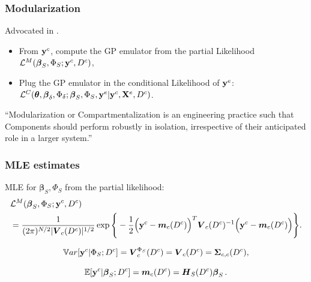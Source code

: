 \documentclass[nopagenumber,9pt]{beamer}
\begin{document}
\begin{frame}
 \frametitle{Modularization}
 Advocated in \cite{liu2009}.
 \begin{itemize}
  \item From $\mathbf{y}^c$, compute the GP emulator from the partial Likelihood $\mathcal{L}^M(\boldsymbol{\beta}_S,\Phi_S;\mathbf{y}^c,D^c)$,
  \item Plug the GP emulator in the conditional Likelihood of $\mathbf{y}^e$: $ \mathcal{L}^C(\boldsymbol{\theta},\boldsymbol{\beta}_{\delta},\Phi_{\delta};\boldsymbol{\beta}_S,\Phi_S,\mathbf{y}^{e}|\mathbf{y}^c,\mathbf{X}^e,D^c)$.
 \end{itemize}

 
 \bigskip
 
 \cite{gramacy2020surrogates}
 ``Modularization or Compartmentalization is an engineering practice such that Components should perform robustly in isolation, irrespective of their anticipated role in a larger system.''
 
\end{frame}



\begin{frame}
 \frametitle{MLE estimates}
 
 
MLE for $\boldsymbol{\beta}_S,\Phi_S$ from the partial likelihood:
\begin{equation*}
\begin{split}
&\mathcal{L}^M(\boldsymbol{\beta}_S,\Phi_S;\mathbf{y}^c,D^c)\\
&=\frac{1}{(2\pi)^{N/2}|\boldsymbol{V}_c(D^c)|^{1/2}}\exp\Bigg\{-\frac{1}{2}\Big(\mathbf{y}^c-\boldsymbol{m}_c(D^c)\Big)^T\boldsymbol{V}_c(D^c)^{-1}\Big(\mathbf{y}^c-\boldsymbol{m}_c(D^c)\Big)\Bigg\}.
\label{eq:PartialLikelihood}
\end{split}
\end{equation*}

\begin{equation*}
\mathbb{V}ar[\mathbf{y}^c|\Phi_S;D^c] = \boldsymbol{V}_c^{\Phi_S}(D^c)=\boldsymbol{V}_c(D^c)= \boldsymbol{\Sigma}_{c,c}(D^c),
\end{equation*}


$$\mathbb{E}[\mathbf{y}^c|\boldsymbol{\beta}_S;D^c]=\boldsymbol{m}_c(D^c) ={\boldsymbol{H}_S}(D^c)\boldsymbol{\beta}_S\,.$$
 
 \end{frame}
 
 
 
\end{document}
